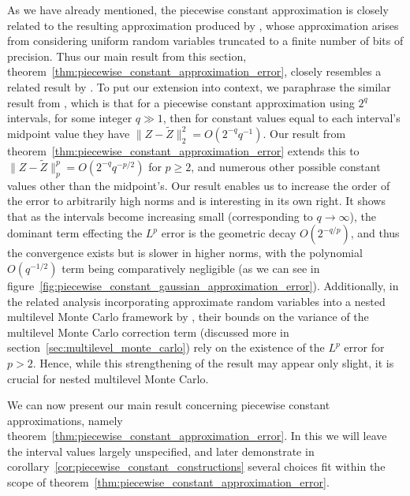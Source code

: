 \documentclass[manuscript,review]{acmart}
\begin{document}
As we have already mentioned, the piecewise constant approximation is closely related to the resulting approximation produced by \citet{giles2019random_quadrature}, whose approximation arises from considering uniform random variables truncated to a finite number of bits of precision. Thus our main result from this section, theorem~\ref{thm:piecewise_constant_approximation_error}, closely resembles a related result by \citet[theorem~1]{giles2019random_quadrature}. To put our extension into context, we paraphrase the similar result from \citet{giles2019random_quadrature}, which is that for a piecewise constant approximation using $ 2^q $ intervals, for some integer $ q \gg 1 $, then for constant values equal to each interval's midpoint value they have $ \lVert Z - \tilde{Z}\rVert_2^2 = O(2^{-q}q^{-1}) $. Our result from theorem~\ref{thm:piecewise_constant_approximation_error} extends this to $ \lVert Z - \tilde{Z}\rVert_p^p = O(2^{-q} q^{-p/2}) $ for $ p \geq 2 $, and numerous other possible constant values other than the midpoint's. Our result enables us to increase the order of the error to arbitrarily high norms and is interesting in its own right. It shows that as the intervals become increasing small (corresponding to $ q \to \infty $), the dominant term effecting the $ L^p $ error is the geometric decay $ O(2^{-q/p}) $, and thus the convergence exists but is slower in higher norms, with the polynomial $ O(q^{-1/2}) $ term being comparatively negligible (as we can see in figure~\ref{fig:piecewise_constant_gaussian_approximation_error}). Additionally, in the related analysis incorporating approximate random variables into a nested multilevel Monte Carlo framework by \citeauthor{giles2020approximate} \citep{giles2020approximate,sheridan2020nested}, their bounds on the variance of the multilevel Monte Carlo correction term (discussed more in section~\ref{sec:multilevel_monte_carlo}) rely on the existence of the $ L^p $ error for $ p > 2 $. Hence, while this strengthening of the result may appear only slight, it is crucial for nested multilevel Monte Carlo. 

We can now present our main result concerning piecewise constant approximations, namely theorem~\ref{thm:piecewise_constant_approximation_error}. In this we will leave the interval values largely unspecified, and later demonstrate in corollary~\ref{cor:piecewise_constant_constructions} several choices fit within the scope of theorem~\ref{thm:piecewise_constant_approximation_error}.
\end{document}
